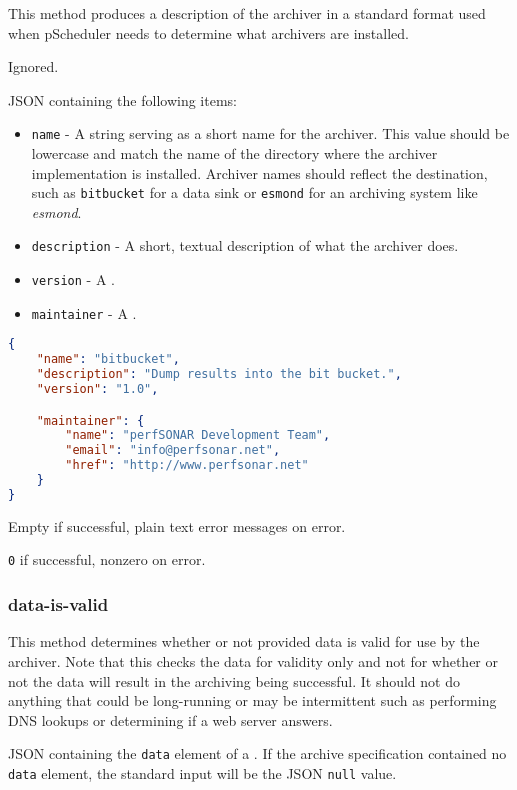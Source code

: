 \documentclass[10pt,titlepage]{article}
\begin{document}
This method produces a description of the archiver in a standard
format used when pScheduler needs to determine what archivers are
installed.

 Ignored.

 JSON containing the following items:
\begin{itemize}
\item{\tt name} - A string serving as a short name for the archiver.
  This value should be lowercase and match the name of the directory
  where the archiver implementation is installed.  Archiver names
  should reflect the destination, such as {\tt bitbucket} for a data
  sink or {\tt esmond} for an archiving system like {\it esmond}.
\item{\tt description} - A short, textual description of what the
  archiver does.
\item{\tt version} - A .
\item{\tt maintainer} - A .
\end{itemize}

\example
\begin{lstlisting}[language=json,firstnumber=1]
{
    "name": "bitbucket",
    "description": "Dump results into the bit bucket.",
    "version": "1.0",

    "maintainer": {
        "name": "perfSONAR Development Team",
        "email": "info@perfsonar.net",
        "href": "http://www.perfsonar.net"
    }
}
\end{lstlisting}

 Empty if successful, plain text error
messages on error.

 {\tt 0} if successful, nonzero on error.



\subsubsection{data-is-valid}

This method determines whether or not provided data is valid for use
by the archiver.  Note that this checks the data for validity only and
not for whether or not the data will result in the archiving being
successful.  It should not do anything that could be long-running or
may be intermittent such as performing DNS lookups or determining if a
web server answers.

 JSON containing the {\tt data} element of
a .  If the archive specification
contained no {\tt data} element, the standard input will be the JSON
{\tt null} value.
\end{document}
